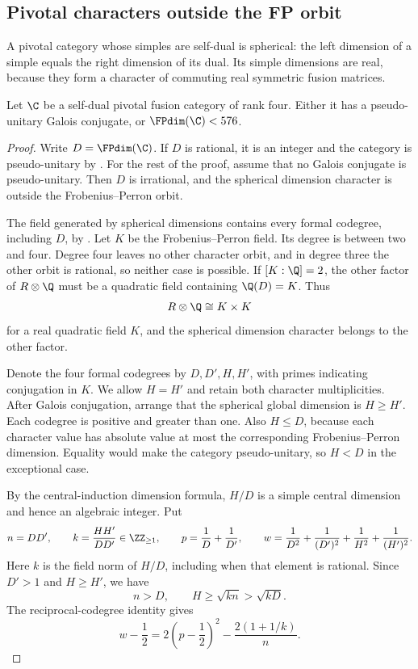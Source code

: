 \subsection{Pivotal characters outside the FP orbit}

A pivotal category whose simples are self-dual is spherical: the left
dimension of a simple equals the right dimension of its dual. Its
simple dimensions are real, because they form a character of commuting
real symmetric fusion matrices.

\begin{lemma}\label{pivbd:lem:exceptional}
Let $\C$ be a self-dual pivotal fusion category of rank four. Either it has a pseudo-unitary Galois conjugate, or $\FPdim(\C)<576$.
\end{lemma}
\begin{proof}
Write $D=\FPdim(\C)$. If $D$ is rational, it is an integer and the category is pseudo-unitary by \cite[Proposition~8.24]{ENO}. For the rest of the proof, assume that no Galois conjugate is pseudo-unitary. Then $D$ is irrational, and the spherical dimension character is outside the Frobenius--Perron orbit.

The field generated by spherical dimensions contains every formal codegree, including $D$, by \cite[Corollary~2.15]{Ostrik3}. Let $K$ be the Frobenius--Perron field. Its degree is between two and four. Degree four leaves no other character orbit, and in degree three the other orbit is rational, so neither case is possible. If $[K:\Q]=2$, the other factor of $R\otimes\Q$ must be a quadratic field containing $\Q(D)=K$. Thus
\begin{equation}\label{pivbd:eq:repeated-quadratic}
 R\otimes\Q\cong K\times K
\end{equation}
for a real quadratic field $K$, and the spherical dimension character belongs to the other factor.

Denote the four formal codegrees by $D,D',H,H'$, with primes indicating conjugation in $K$. We allow $H=H'$ and retain both character multiplicities. After Galois conjugation, arrange that the spherical global dimension is $H\geq H'$. Each codegree is positive and greater than one. Also $H\leq D$, because each character value has absolute value at most the corresponding Frobenius--Perron dimension. Equality would make the category pseudo-unitary, so $H<D$ in the exceptional case.

By the central-induction dimension formula, $H/D$ is a simple central dimension and hence an algebraic integer. Put
\[
 n=DD',\qquad k=\frac{HH'}{DD'}\in\ZZ_{\geq1},\qquad
 p=\frac1D+\frac1{D'},\qquad
 w=\frac1{D^2}+\frac1{(D')^2}+\frac1{H^2}+\frac1{(H')^2}.
\]
Here $k$ is the field norm of $H/D$, including when that element is rational. Since $D'>1$ and $H\geq H'$, we have
\begin{equation}\label{pivbd:eq:exceptional-size}
 n>D,\qquad H\geq\sqrt{kn}>\sqrt{kD}.
\end{equation}
The reciprocal-codegree identity gives
\begin{equation}\label{pivbd:eq:exceptional-w}
 w-\frac12=2\left(p-\frac12\right)^2-\frac{2(1+1/k)}n.
\end{equation}


\end{proof}
